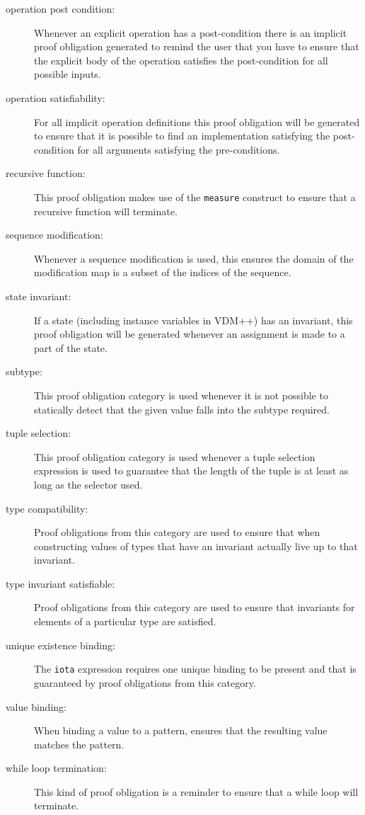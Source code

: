 \begin{description}
\item[operation post condition:] Whenever an explicit operation has a
  post-condition there is an implicit proof obligation generated to
  remind the user that you have to ensure that the explicit body
  of the operation satisfies the post-condition for all possible inputs.

\item[operation satisfiability:] For all implicit operation definitions
  this proof obligation will be generated to ensure that it is
  possible to find an implementation satisfying the post-condition for all
  arguments satisfying the pre-conditions.

\item[recursive function:] This proof obligation makes use of the
  \texttt{measure} construct to ensure that a recursive function
  will terminate.

\item[sequence modification:] Whenever a sequence modification is used, this
    ensures the domain of the modification map is a subset of the indices of the 
    sequence.

\item[state invariant:] If a state (including instance variables in
  VDM++) has an invariant, this proof obligation will be generated
  whenever an assignment is made to a part of the state.

\item[subtype:] This proof obligation category is used whenever it is
  not possible to statically detect that the given value
  falls into the subtype required.

\item[tuple selection:] This proof obligation category is used
  whenever a tuple selection expression is used to
  guarantee that the length of the tuple is at least as long as the
  selector used.

\item[type compatibility:] Proof obligations from this category are used to ensure that when constructing values of types that have an invariant actually live up to that invariant.

\item[type invariant satisfiable:] Proof obligations from this category are used
  to ensure that invariants for elements of a particular type are satisfied.

\item[unique existence binding:] The \texttt{iota} expression
  requires one unique binding to be present and that is guaranteed by
  proof obligations from this category.

\item[value binding:] When binding a value to a pattern, ensures that the
    resulting value matches the pattern.

\item[while loop termination:] This kind of proof obligation is a
  reminder to ensure that a while loop will terminate.

\end{description}

